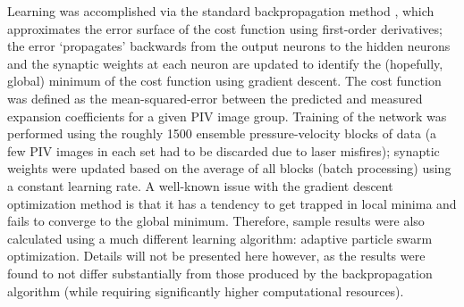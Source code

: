Learning was accomplished via the standard backpropagation method \citep{Haykin1994}, which approximates the error surface of the cost function using first-order derivatives; the error `propagates' backwards from the output neurons to the hidden neurons and the synaptic weights at each neuron are updated to identify the (hopefully, global) minimum of the cost function using gradient descent.
The cost function was defined as the mean-squared-error between the predicted and measured expansion coefficients for a given PIV image group.
Training of the network was performed using the roughly 1500 ensemble pressure-velocity blocks of data (a few PIV images in each set had to be discarded due to laser misfires); synaptic weights were updated based on the average of all blocks (batch processing) using a constant learning rate.
A well-known issue with the gradient descent optimization method is that it has a tendency to get trapped in local minima and fails to converge to the global minimum.
Therefore, sample results were also calculated using a much different learning algorithm: adaptive particle swarm optimization.
Details will not be presented here however, as the results were found to not differ substantially from those produced by the backpropagation algorithm (while requiring significantly higher computational resources).


